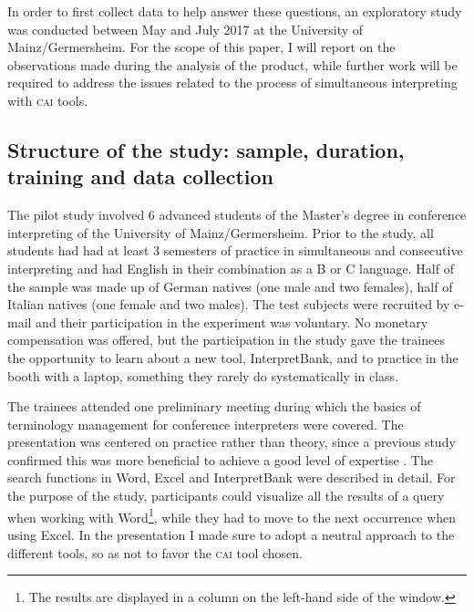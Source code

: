 \documentclass[output=paper]{langsci/langscibook}
\begin{document}
In order to first collect data to help answer these questions, an exploratory study was conducted between May and July 2017 at the University of Mainz\slash Germersheim. For the scope of this paper, I will report on the observations made during the analysis of the product, while further work will be required to address the issues related to the process of simultaneous interpreting with \textsc{cai} tools.

\subsection{Structure of the study: sample, duration, training and data collection}\label{sec:prandi:3.3}
The pilot study involved 6 advanced students of the Master’s degree in conference interpreting of the University of Mainz\slash Germersheim. Prior to the study, all students had had at least 3 semesters of practice in simultaneous and consecutive interpreting and had English in their combination as a B or C language. Half of the sample was made up of German natives (one male and two females), half of Italian natives (one female and two males). The test subjects were recruited by e-mail and their participation in the experiment was voluntary. No monetary compensation was offered, but the participation in the study gave the trainees the opportunity to learn about a new tool, InterpretBank, and to practice in the booth with a laptop, something they rarely do systematically in class.

The trainees attended one preliminary meeting during which the basics of terminology management for conference interpreters were covered. The presentation was centered on practice rather than theory, since a previous study confirmed this was more beneficial to achieve a good level of expertise \citep{Prandi2015a, Prandi2015b}. The search functions in Word, Excel and InterpretBank were described in detail. For the purpose of the study, participants could visualize all the results of a query when working with Word\footnote{The results are displayed in a column on the left-hand side of the window.}, while they had to move to the next occurrence when using Excel. In the presentation I made sure to adopt a neutral approach to the different tools, so as not to favor the \textsc{cai} tool chosen.
\end{document}
